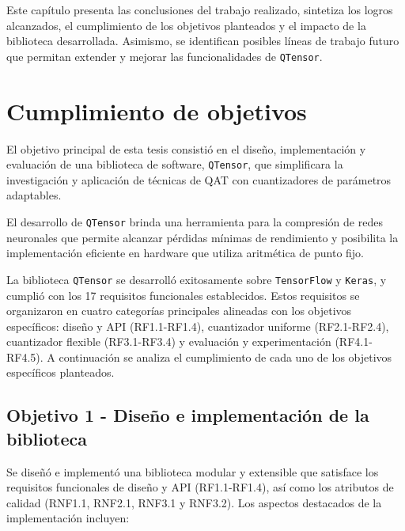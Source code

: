 Este capítulo presenta las conclusiones del trabajo realizado, sintetiza los logros alcanzados, el cumplimiento de los objetivos planteados y el impacto de la biblioteca desarrollada. Asimismo, se identifican posibles líneas de trabajo futuro que permitan extender y mejorar las funcionalidades de \texttt{QTensor}.

\section{Cumplimiento de objetivos}
\label{sec:cumplimiento_objetivos}

El objetivo principal de esta tesis consistió en el diseño, implementación y evaluación de una biblioteca de software, \texttt{QTensor}, que simplificara la investigación y aplicación de técnicas de QAT con cuantizadores de parámetros adaptables.

El desarrollo de \texttt{QTensor} brinda una herramienta para la compresión de redes neuronales que permite alcanzar pérdidas mínimas de rendimiento y posibilita la implementación eficiente en hardware que utiliza aritmética de punto fijo.

La biblioteca \texttt{QTensor} se desarrolló exitosamente sobre \texttt{TensorFlow} y \texttt{Keras}, y cumplió con los 17 requisitos funcionales establecidos. Estos requisitos se organizaron en cuatro categorías principales alineadas con los objetivos específicos: diseño y API (RF1.1-RF1.4), cuantizador uniforme (RF2.1-RF2.4), cuantizador flexible (RF3.1-RF3.4) y evaluación y experimentación (RF4.1-RF4.5). A continuación se analiza el cumplimiento de cada uno de los objetivos específicos planteados.

\subsection{Objetivo 1 - Diseño e implementación de la biblioteca}

Se diseñó e implementó una biblioteca modular y extensible que satisface los requisitos funcionales de diseño y API (RF1.1-RF1.4), así como los atributos de calidad (RNF1.1, RNF2.1, RNF3.1 y RNF3.2). Los aspectos destacados de la implementación incluyen:

